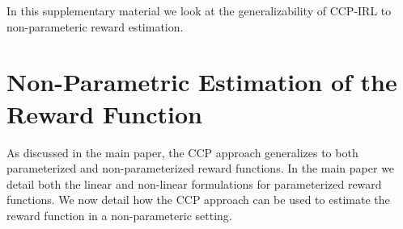 \documentclass{article}
\begin{document}
In this supplementary material we look at the generalizability of CCP-IRL to non-parameteric reward estimation.


\section{Non-Parametric Estimation of the Reward Function}

As discussed in the main paper, the CCP approach generalizes to both parameterized and non-parameterized reward functions. In the main paper we detail both the linear and non-linear formulations for parameterized reward functions. We now detail how the CCP approach can be used to estimate the reward function in a non-parameteric setting.  
\end{document}
